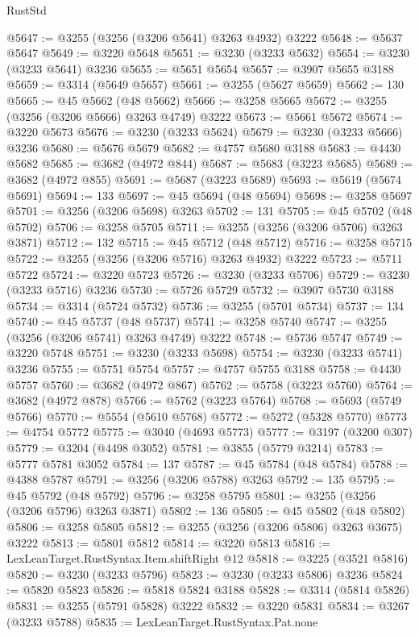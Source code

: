 \begin{lexlean}{RustStd}
\begin{coremodule}
{\begin{coremodule}
{{{{{{{{{{{{{{{{{{{{{{{{{{{{{{{{{{{{{@5647 := @3255 (@3256 (@3206 @5641) @3263 @4932) @3222
@5648 := @5637 @5647
@5649 := @3220 @5648
@5651 := @3230 (@3233 @5632)
@5654 := @3230 (@3233 @5641) @3236
@5655 := @5651 @5654
@5657 := @3907 @5655 @3188
@5659 := @3314 (@5649 @5657)
@5661 := @3255 (@5627 @5659)
@5662 := 130
@5665 := @45 @5662 (@48 @5662)
@5666 := @3258 @5665
@5672 := @3255 (@3256 (@3206 @5666) @3263 @4749) @3222
@5673 := @5661 @5672
@5674 := @3220 @5673
@5676 := @3230 (@3233 @5624)
@5679 := @3230 (@3233 @5666) @3236
@5680 := @5676 @5679
@5682 := @4757 @5680 @3188
@5683 := @4430 @5682
@5685 := @3682 (@4972 @844)
@5687 := @5683 (@3223 @5685)
@5689 := @3682 (@4972 @855)
@5691 := @5687 (@3223 @5689)
@5693 := @5619 (@5674 @5691)
@5694 := 133
@5697 := @45 @5694 (@48 @5694)
@5698 := @3258 @5697
@5701 := @3256 (@3206 @5698) @3263
@5702 := 131
@5705 := @45 @5702 (@48 @5702)
@5706 := @3258 @5705
@5711 := @3255 (@3256 (@3206 @5706) @3263 @3871)
@5712 := 132
@5715 := @45 @5712 (@48 @5712)
@5716 := @3258 @5715
@5722 := @3255 (@3256 (@3206 @5716) @3263 @4932) @3222
@5723 := @5711 @5722
@5724 := @3220 @5723
@5726 := @3230 (@3233 @5706)
@5729 := @3230 (@3233 @5716) @3236
@5730 := @5726 @5729
@5732 := @3907 @5730 @3188
@5734 := @3314 (@5724 @5732)
@5736 := @3255 (@5701 @5734)
@5737 := 134
@5740 := @45 @5737 (@48 @5737)
@5741 := @3258 @5740
@5747 := @3255 (@3256 (@3206 @5741) @3263 @4749) @3222
@5748 := @5736 @5747
@5749 := @3220 @5748
@5751 := @3230 (@3233 @5698)
@5754 := @3230 (@3233 @5741) @3236
@5755 := @5751 @5754
@5757 := @4757 @5755 @3188
@5758 := @4430 @5757
@5760 := @3682 (@4972 @867)
@5762 := @5758 (@3223 @5760)
@5764 := @3682 (@4972 @878)
@5766 := @5762 (@3223 @5764)
@5768 := @5693 (@5749 @5766)
@5770 := @5554 (@5610 @5768)
@5772 := @5272 (@5328 @5770)
@5773 := @4754 @5772
@5775 := @3040 (@4693 @5773)
@5777 := @3197 (@3200 @307)
@5779 := @3204 (@4498 @3052)
@5781 := @3855 (@5779 @3214)
@5783 := @5777 @5781 @3052
@5784 := 137
@5787 := @45 @5784 (@48 @5784)
@5788 := @4388 @5787
@5791 := @3256 (@3206 @5788) @3263
@5792 := 135
@5795 := @45 @5792 (@48 @5792)
@5796 := @3258 @5795
@5801 := @3255 (@3256 (@3206 @5796) @3263 @3871)
@5802 := 136
@5805 := @45 @5802 (@48 @5802)
@5806 := @3258 @5805
@5812 := @3255 (@3256 (@3206 @5806) @3263 @3675) @3222
@5813 := @5801 @5812
@5814 := @3220 @5813
@5816 := LexLeanTarget.RustSyntax.Item.shiftRight @12
@5818 := @3225 (@3521 @5816)
@5820 := @3230 (@3233 @5796)
@5823 := @3230 (@3233 @5806) @3236
@5824 := @5820 @5823
@5826 := @5818 @5824 @3188
@5828 := @3314 (@5814 @5826)
@5831 := @3255 (@5791 @5828) @3222
@5832 := @3220 @5831
@5834 := @3267 (@3233 @5788)
@5835 := LexLeanTarget.RustSyntax.Pat.none
}}}}}}}}}}}}}}}}}}}}}}}}}}}}}}}}}}}}}
\end{coremodule}}
\end{coremodule}
\end{lexlean}
